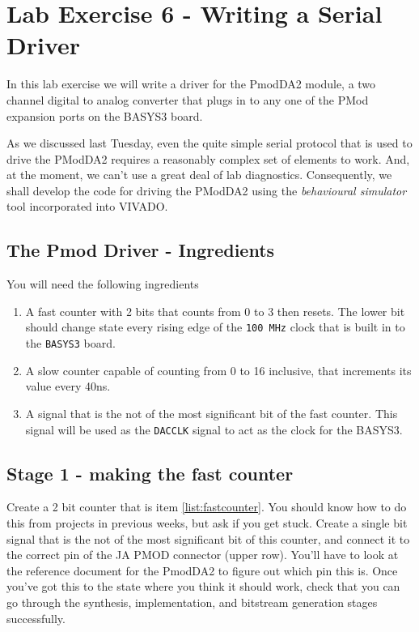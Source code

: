 \documentclass[../physical_computing.tex]{subfiles}
\begin{document}
\chapter{Lab Exercise 6 - Writing a Serial Driver}
\label{sec:appendix_6}

In this lab exercise we will write a driver for the PmodDA2 module, a two channel digital to analog converter that plugs in to any one of the PMod expansion ports on the BASYS3 board.

As we discussed last Tuesday, even the quite simple serial protocol that is used to drive the PModDA2 requires a reasonably complex set of elements to work. And, at the moment, we can't use a great deal of lab diagnostics. Consequently, we shall develop the code for driving the PModDA2 using the {\it behavioural simulator} tool incorporated into VIVADO.

\section{The Pmod Driver - Ingredients}
\label{sec:ingredients}

You will need the following ingredients
\begin{enumerate}
    \item A fast counter with 2 bits that counts from 0 to 3 then resets. The lower bit should change state every rising edge of the \texttt{100\,MHz} clock that is built in to the \texttt{BASYS3} board. \label{list:fastcounter}
    \item A slow counter capable of counting from 0 to 16 inclusive, that increments its value every 40ns. 
    \item A signal that is the not of the most significant bit of the fast counter. This signal will be used as the \texttt{DACCLK} signal to act as the clock for the BASYS3.
\end{enumerate}

\section{Stage 1 - making the fast counter}
\label{sec:clocks}

Create a 2 bit counter that is item \ref{list:fastcounter}. You should know how to do this from projects in previous weeks, but ask if you get stuck. Create a single bit signal that is the not of the most significant bit of this counter, and connect it to the correct pin of the JA PMOD connector (upper row). You'll have to look at the reference document for the PmodDA2 to figure out which pin this is. Once you've got this to the state where you think it should work, check that you can go through the synthesis, implementation, and bitstream generation stages successfully.
\end{document}
